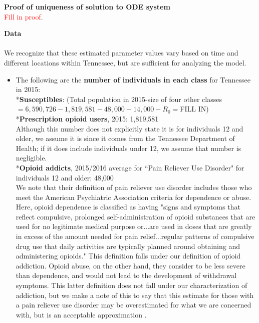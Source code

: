 \documentclass[12pt]{article}
\begin{document}



 \textbf{Proof of uniqueness of solution to ODE system} \\
\textcolor{red}{Fill in proof}. 








\textbf{Data} \\ \\
We recognize that these estimated parameter values vary based on time and different locations within Tennessee, but are sufficient for analyzing the model. 
\begin{itemize}



\item The following are the \textbf{number of individuals in each class} for Tennessee in 2015: \\

*\textbf{Susceptibles}: (Total population in 2015-size of four other classes$=6,590,726-1,819,581-48,000-14,000-R_{0}=$FILL IN) \cite{USCensus} \\

*\textbf{Prescription opioid users}, 2015: 1,819,581 \cite{TNgov1} \\
Although this number does not explicitly state it is for individuals 12 and older, we assume it is since it comes from the Tennessee Department of Health; if it does include individuals under 12, we assume that number is negligible. \\

*\textbf{Opioid addicts}, 2015/2016 average for ``Pain Reliever Use Disorder" for individuals 12 and older: 48,000 \cite{NSDUH2} \\
We note that their definition of pain reliever use disorder includes those who meet the American Psychiatric Association criteria for dependence or abuse. Here, opioid dependence is classified as having "signs and symptoms that reflect compulsive, prolonged self-administration of opioid substances that are used for no legitimate medical purpose or...are used in doses that are greatly in excess of the amount needed for pain relief...regular patterns of compulsive drug use that daily activities are typically planned around obtaining and administering opioids." This definition falls under our definition of opioid addiction. Opioid abuse, on the other hand, they consider to be less severe than dependence, and would not lead to the development of withdrawal symptoms. This latter definition does not fall under our characterization of addiction, but we make a note of this to say that this estimate for those with a pain reliever use disorder may be overestimated for what we are concerned with, but is an acceptable approximation  \cite{DSM}.\\


\end{itemize}
\end{document}
